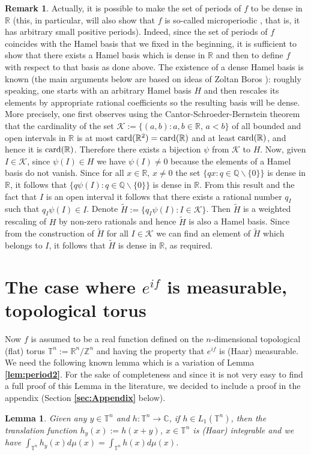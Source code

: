 \documentclass[12 pt]{amsart}
\newtheorem{lem}[thm]{Lemma}
\theoremstyle{definition}
\newtheorem{remark}[thm]{Remark}
\newcommand{\R}{\mathbb{R}}
\newcommand{\Q}{\mathbb{Q}}
\newcommand{\C}{\mathbb{C}}
\newcommand{\Z}{\mathbb{Z}}
\newcommand{\T}{\mathbb{T}}
\newcommand{\card}{\textnormal{card}}
\newcommand{\bref}[1]{\textbf{\ref{#1}}} %
\begin{document}
\begin{remark}
Actually, it is possible to make the set of periods of $f$ to be dense in $\R$ (this, in  particular, will also show that $f$ is so-called microperiodic \cite[p. 332]{Kuczma2009book}, that is, it has arbitrary small positive  periods). Indeed, since the set of periods of $f$ coincides with the Hamel basis that we fixed in the beginning, it is sufficient to show that there exists a Hamel basis which is dense in $\R$ and then to define $f$ with respect to that  basis as done above. The existence of a dense Hamel basis is known (the main arguments below are based on ideas of Zoltan Boros \cite{Boros2015personal}): roughly speaking, one starts with an arbitrary Hamel basis $H$ and then rescales its elements by appropriate rational coefficients so the resulting basis will be dense. More precisely, one first observes using the Cantor-Schroeder-Bernstein theorem that the cardinality of the set $\mathscr{K}:=\{(a,b): a,b\in\R,\, a<b\}$ of all bounded and open intervals in $\R$ is at most $\card(\R^2)=\card(\R)$ and at least $\card(\R)$, and hence it is $\card(\R)$. Therefore there exists a bijection $\psi$ from $\mathscr{K}$ to $H$. Now, given $I\in \mathscr{K}$, since $\psi(I)\in H$ we have $\psi(I)\neq 0$ because the elements of a Hamel basis do not vanish. Since for all $x\in\R$, $x\neq 0$ the set $\{qx: q\in\Q\backslash\{0\}\}$ is dense in $\R$, it follows that $\{q\psi(I): q\in \Q\backslash\{0\}\}$ is dense in $\R$. From this result and the fact that $I$ is an open interval it follows that there exists a rational number $q_I$ such that $q_I\psi(I)\in I$. Denote $\tilde{H}:=\{q_I\psi(I): I\in\mathscr{K}\}$. Then $\tilde{H}$ is a weighted rescaling of $H$ by non-zero rationals and hence $\tilde{H}$ is also a Hamel basis. Since from the construction of $\tilde{H}$ for all $I\in \mathscr{K}$ we can find an element of $\tilde{H}$ which belongs to $I$, it follows that $\tilde{H}$ is dense in $\R$, as required. 
\end{remark}





\section{The case where $e^{if}$ is measurable, topological torus}\label{sec:Torus}
Now $f$ is assumed to be a real function defined on the $n$-dimensional topological (flat) torus $\T^n:=\R^n/\Z^n$ and having the property that $e^{if}$ is (Haar) measurable. We need the following known lemma which is a variation of Lemma \bref{lem:period2}. For the sake of completeness and since it is not very easy to find a full proof of this Lemma in the literature, we decided to include a proof in the appendix (Section \bref{sec:Appendix} below). 
\begin{lem}\label{lem:Torus}
Given any $y\in \T^n$ and $h:\T^n\to \C$, if $h\in L_1(\T^n)$, then the translation function $h_y(x):=h(x+y)$, $x\in\T^n$ is (Haar) integrable and we have 
$\int_{\T^n}h_y(x)d\mu(x)=\int_{\T^n}h(x)d\mu(x)$. 
\end{lem}
\end{document}
